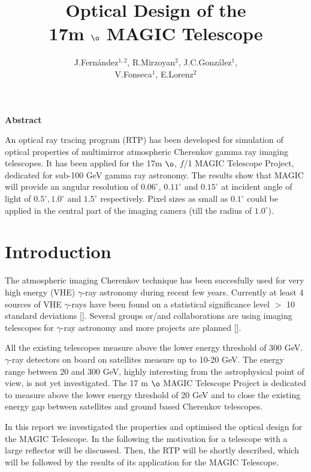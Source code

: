 
\title{Optical Design of the \\ 17m $\o$ MAGIC Telescope}
\author{J.Fern\'{a}ndez$^{1,2}$, R.Mirzoyan$^{2}$,
  J.C.Gonz\'{a}lez$^{1}$, \\ V.Fonseca$^{1}$, E.Lorenz$^{2}$} \date{}
\maketitle


\centerline{{\bf Abstract}}

An optical ray tracing program (RTP) has been developed for simulation
of optical properties of multimirror atmospheric Cherenkov gamma ray
imaging telescopes. It has been applied for the 17m $\o$, $f$/1 MAGIC
Telescope Project, dedicated for sub-100 GeV gamma ray astronomy. The
results show that MAGIC will provide an angular resolution of
$0.06^{\circ}$, $0.11^{\circ}$ and $0.15^{\circ}$ at incident angle of
light of $0.5^{\circ},1.0^{\circ}$ and $1.5^{\circ}$ respectively.
Pixel sizes as small as $0.1^{\circ}$ could be applied in the central
part of the imaging camera (till the radius of $1.0^{\circ}$).

\section{Introduction}

The atmospheric imaging Cherenkov technique has been succesfully used
for very high energy (VHE) $\gamma$-ray astronomy during recent few
years. Currently at least 4 sources of VHE $\gamma$-rays have been
found on a statistical significance level $ > $ 10 standard deviations
[]. Several groups or/and collaborations are using imaging telescopes
for $ \gamma $-ray astronomy and more projects are planned [].

All the existing telescopes measure above the lower energy threshold
of 300 GeV. $\gamma$-ray detectors on board on satellites measure up
to 10-20 GeV. The energy range between 20 and 300 GeV, highly
interesting from the astrophysical point of view, is not yet
investigated. The 17 m $\o$ MAGIC Telescope Project is dedicated to
measure above the lower energy threshold of 20 GeV and to close the
existing energy gap between satellites and ground based Cherenkov
telescopes.

In this report we investigated the properties and optimised the
optical design for the MAGIC Telescope. In the following the
motivation for a telescope with a large reflector will be
discussed. Then, the RTP will be shortly described, which will be
followed by the results of its application for the MAGIC Telescope.


